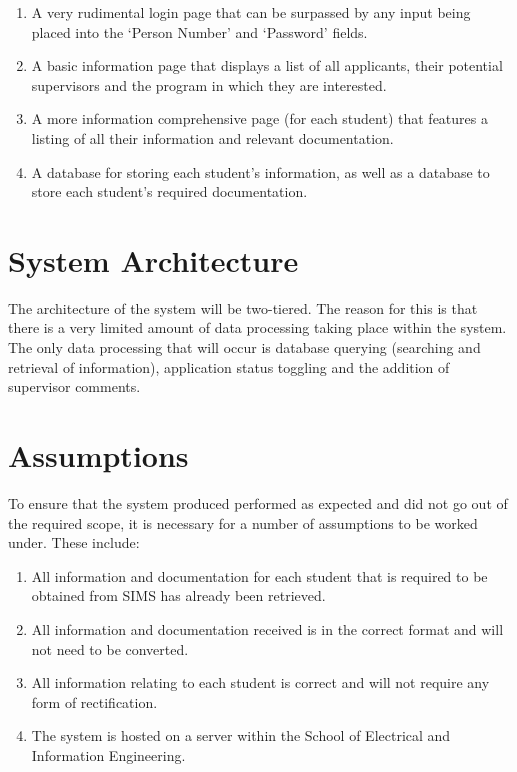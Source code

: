 \documentclass[journal]{IEEEtran}
\begin{document}
\begin{enumerate}
	\item A very rudimental login page that can be surpassed by any input being placed into the `Person Number' and `Password' fields.
	\item A basic information page that displays a list of all applicants, their potential supervisors and the program in which they are interested.
	\item A more information comprehensive page (for each student) that features a listing of all their information and relevant documentation.
	\item A database for storing each student's information, as well as a database to store each student's required documentation.
\end{enumerate}


\section{System Architecture}

The architecture of the system will be two-tiered. The reason for this is that there is a very limited amount of data processing taking place within the system. The only data processing that will occur is database querying (searching and retrieval of information), application status toggling and the addition of supervisor comments.


\section{Assumptions}

To ensure that the system produced performed as expected and did not go out of the required scope, it is necessary for a number of assumptions to be worked under. These include:

\begin{enumerate}
	\item All information and documentation for each student that is required to be obtained from SIMS has already been retrieved.
	\item All information and documentation received is in the correct format and will not need to be converted.
	\item All information relating to each student is correct and will not require any form of rectification.
	\item The system is hosted on a server within the School of Electrical and Information Engineering.
\end{enumerate}
\end{document}
